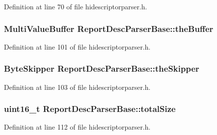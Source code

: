\-Definition at line 70 of file hidescriptorparser.\-h.

\hypertarget{class_report_desc_parser_base_a5ac0dd6f06df15a4cd2bad3fa175e7b9}{
\subsubsection[{the\-Buffer}]{\setlength{\rightskip}{0pt plus 5cm}\-Multi\-Value\-Buffer {\bf \-Report\-Desc\-Parser\-Base\-::the\-Buffer}}}\label{class_report_desc_parser_base_a5ac0dd6f06df15a4cd2bad3fa175e7b9}


\-Definition at line 101 of file hidescriptorparser.\-h.

\hypertarget{class_report_desc_parser_base_a23b769d890d9f578fd6b8f47cb1f7e23}{
\subsubsection[{the\-Skipper}]{\setlength{\rightskip}{0pt plus 5cm}\-Byte\-Skipper {\bf \-Report\-Desc\-Parser\-Base\-::the\-Skipper}}}\label{class_report_desc_parser_base_a23b769d890d9f578fd6b8f47cb1f7e23}


\-Definition at line 103 of file hidescriptorparser.\-h.

\hypertarget{class_report_desc_parser_base_aa5223ad6eb8be8c7fb53a98d4ddde594}{
\subsubsection[{total\-Size}]{\setlength{\rightskip}{0pt plus 5cm}uint16\-\_\-t {\bf \-Report\-Desc\-Parser\-Base\-::total\-Size}}}\label{class_report_desc_parser_base_aa5223ad6eb8be8c7fb53a98d4ddde594}


\-Definition at line 112 of file hidescriptorparser.\-h.

